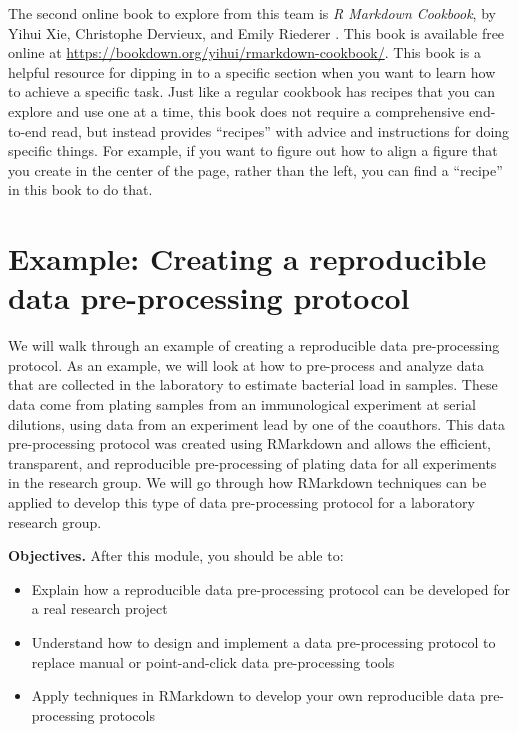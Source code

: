 \documentclass[]{tufte-book}
\providecommand{\tightlist}{%
  \setlength{\itemsep}{0pt}\setlength{\parskip}{0pt}}
\begin{document}
The second online book to explore from this team is \emph{R Markdown Cookbook}, by
Yihui Xie, Christophe Dervieux, and Emily Riederer \citep{xie2020r}. This book is available
free online at \url{https://bookdown.org/yihui/rmarkdown-cookbook/}. This book is a
helpful resource for dipping in to a specific section when you want to learn how
to achieve a specific task. Just like a regular cookbook has recipes that you
can explore and use one at a time, this book does not require a comprehensive
end-to-end read, but instead provides ``recipes'' with advice and instructions for
doing specific things. For example, if you want to figure out how to align a
figure that you create in the center of the page, rather than the left, you can
find a ``recipe'' in this book to do that.

\section{Example: Creating a reproducible data pre-processing protocol}\label{module20}

We will walk through an example of creating a reproducible data pre-processing
protocol. As an example, we will look at how to pre-process and analyze data
that are collected in the laboratory to estimate bacterial load in samples.
These data come from plating samples from an immunological experiment at serial
dilutions, using data from an experiment lead by one of the coauthors. This data
pre-processing protocol was created using RMarkdown and allows the efficient,
transparent, and reproducible pre-processing of plating data for all experiments
in the research group. We will go through how RMarkdown techniques can be
applied to develop this type of data pre-processing protocol for a laboratory
research group.

\textbf{Objectives.} After this module, you should be able to:

\begin{itemize}
\tightlist
\item
  Explain how a reproducible data pre-processing protocol can be developed for
  a real research project
\item
  Understand how to design and implement a data pre-processing protocol to
  replace manual or point-and-click data pre-processing tools
\item
  Apply techniques in RMarkdown to develop your own reproducible data
  pre-processing protocols
\end{itemize}
\end{document}
